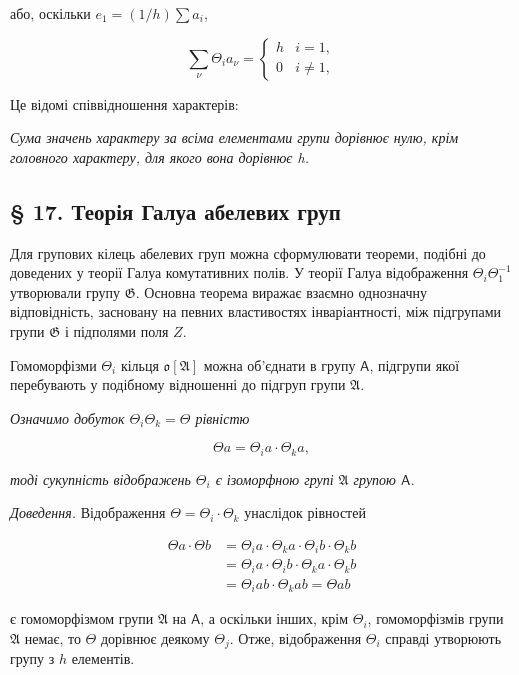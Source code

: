 \documentclass[11pt]{article}
\begin{document}
або, оскільки \(e_1 = (1/h) \sum a_i\),

\[
\sum_\nu \Theta_i a_\nu=\begin{cases} h & i=1,\\ 0 & i\ne 1, \end{cases}
\]

Це відомі співвідношення характерів:

\emph{Сума значень характеру за всіма елементами групи дорівнює нулю, крім головного характеру, для якого вона дорівнює h.}

\subsection*{§ 17. Теорія Галуа абелевих груп}\label{die-galoissche-theorie-abelscher-gruppen}

Для групових кілець абелевих груп можна сформулювати теореми, подібні до доведених у теорії Галуа комутативних полів. У теорії Галуа відображення \(\Theta_i\Theta_1^{-1}\) утворювали групу \(\mathfrak{G}\). Основна теорема виражає взаємно однозначну відповідність, засновану на певних властивостях інваріантності, між підгрупами групи \(\mathfrak{G}\) і підполями поля \(Z\).

Гомоморфізми \(\Theta_i\) кільця \(\mathfrak{o}[\mathfrak{A}]\) можна об'єднати в групу \(\mathsf A\), підгрупи якої перебувають у подібному відношенні до підгруп групи \(\mathfrak{A}\).

\emph{Означимо добуток \(\Theta_i \Theta_k = \Theta\) рівністю}

\[\Theta a = \Theta_i a \cdot \Theta_k a,\]

\emph{тоді сукупність відображень \(\Theta_i\) є ізоморфною групі \(\mathfrak A\) групою \(\mathsf A\).}

\emph{Доведення.} Відображення \(\Theta = \Theta_i \cdot \Theta_k\) унаслідок рівностей

\[\begin{aligned}
\Theta a \cdot \Theta b &= \Theta_i a \cdot \Theta_k a \cdot \Theta_i b \cdot \Theta_k b \\
&= \Theta_i a \cdot \Theta_i b \cdot \Theta_k a \cdot \Theta_k b \\
&= \Theta_i a b \cdot \Theta_k a b = \Theta a b
\end{aligned}\]

є гомоморфізмом групи \(\mathfrak A\) на \(\mathsf A\), а оскільки інших, крім \(\Theta_i\), гомоморфізмів групи \(\mathfrak A\) немає, то \(\Theta\) дорівнює деякому \(\Theta_j\). Отже, відображення \(\Theta_i\) справді утворюють групу з \(h\) елементів.
\end{document}
